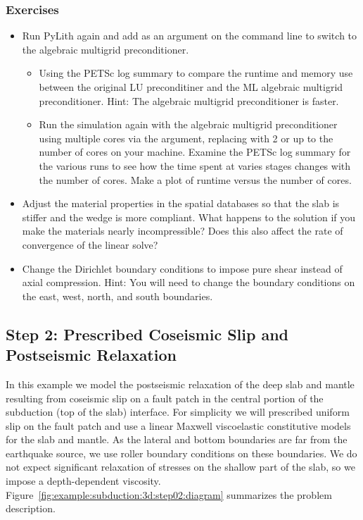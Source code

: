   
\subsubsection{Exercises}


\begin{itemize}
\item Run PyLith again and add
   as an argument on the
  command line to switch to the
  algebraic multigrid preconditioner.
  \begin{itemize}
  \item Using the PETSc log summary to compare the runtime and
    memory use between the original LU preconditiner and the ML
    algebraic multigrid preconditioner. Hint: The algebraic
    multigrid preconditioner is faster.
  \item Run the simulation again with the algebraic multigrid
    preconditioner using multiple cores via the
     argument, replacing
     with 2 or up to the number of cores on your
    machine. Examine the PETSc log summary for the various runs to
    see how the time spent at varies stages changes with the number
    of cores. Make a plot of runtime versus the number of
    cores.
  \end{itemize}
\item Adjust the material properties in the spatial databases so that the slab is stiffer and
  the wedge is more compliant. What happens to the solution if you make the
  materials nearly incompressible? Does this also affect the rate of
  convergence of the linear solve?
\item Change the Dirichlet boundary conditions to impose pure shear
  instead of axial compression. Hint: You will need to change the
  boundary conditions on the east, west, north, and south
  boundaries.
\end{itemize}
    

\subsection{Step 2: Prescribed Coseismic Slip and Postseismic Relaxation}
\label{sec:example:subduction:3d:step02}

In this example we model the postseismic relaxation of the deep slab
and mantle resulting from coseismic slip on a fault patch in the
central portion of the subduction (top of the slab) interface. For
simplicity we will prescribed uniform slip on the fault patch and use
a linear Maxwell viscoelastic constitutive models for the slab and
mantle. As the lateral and bottom boundaries are far from the
earthquake source, we use roller boundary conditions on these
boundaries. We do not expect significant relaxation of stresses on the
shallow part of the slab, so we impose a depth-dependent
viscosity. Figure~\ref{fig:example:subduction:3d:step02:diagram}
summarizes the problem description.

